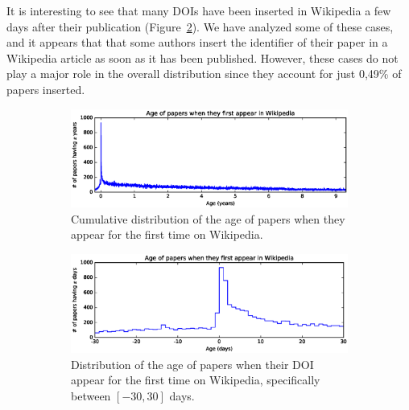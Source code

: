 It is interesting to see that many \acp{DOI} have been inserted in Wikipedia a few days after their publication (Figure~\ref{fig:age_of_papers_at_first_appearance_pdf_near0}).
We have analyzed some of these cases, and it appears that that some authors insert the identifier of their paper in a Wikipedia article as soon as it has been published.
However, these cases do not play a major role in the overall distribution since they account for just 0,49\% of papers inserted.



\begin{figure}[h]
    \centering
    \begin{subfigure}{1\textwidth}
        \centering
        \includegraphics[keepaspectratio=true, width=\linewidth]{assets/age_of_papers_at_first_appearance_pdf}
        \caption{Cumulative distribution of the age of papers when they appear for the first time on Wikipedia.}
\label{fig:age_of_papers_at_first_appearance_pdf}
    \end{subfigure}
    \begin{subfigure}{1\textwidth}
        \centering
        \includegraphics[keepaspectratio=true, width=\linewidth]{assets/age_of_papers_at_first_appearance_pdf_near0}
        \caption{Distribution of the age of papers when their DOI appear for the first time on Wikipedia, specifically between $[-30, 30]$ days.}
\label{fig:age_of_papers_at_first_appearance_pdf_near0}
    \end{subfigure}
    \begin{subfigure}{1\textwidth}
        \centering

\end{subfigure}
\end{figure}
